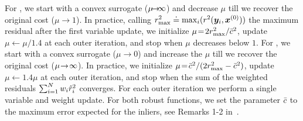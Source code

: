 \begin{remark} %
For \GNCGM, we start with a convex surrogate ($\mu\kern-0.5em\rightarrow\kern-0.5em\infty$) and decrease $\mu$ till we recover the original cost ($\mu\!\rightarrow \!1$). In practice, 
calling $r_{\max}^2 \doteq \max_i( r^2({\bm y}_i, {\bm x}^{(0)}))$ the maximum residual after the first variable update,  we initialize $\mu \!= \!2r^2_{\max} / \bar{c}^2$,
 update $\mu \leftarrow \mu / 1.4$ at each outer iteration, 
 and stop when $\mu$ decreases below $1$.
For \GNCTLS, we start with a convex surrogate ($\mu\rightarrow 0$) and increase the $\mu$ till we recover the original cost ($\mu\kern-0.2em\rightarrow\kern-0.2em\infty$). In practice, 
we initialize  $\mu \!= \!\bar{c}^2 / ( 2 r^2_{\max} - \bar{c}^2 )$,
 update $\mu\!\leftarrow \!1.4 \mu$ at each outer iteration, 
 and stop when the sum of the weighted residuals $\sum_{i=1}^{N} w_i \hat{r}_i^2$ converges.  
 For each outer iteration we perform a single variable and weight update. For both robust functions, we set the parameter $\bar{c}$ to the maximum {error expected for the inliers, see Remarks 1-2 in~\cite{Yang19iccv-QUASAR}.}
\end{remark}

